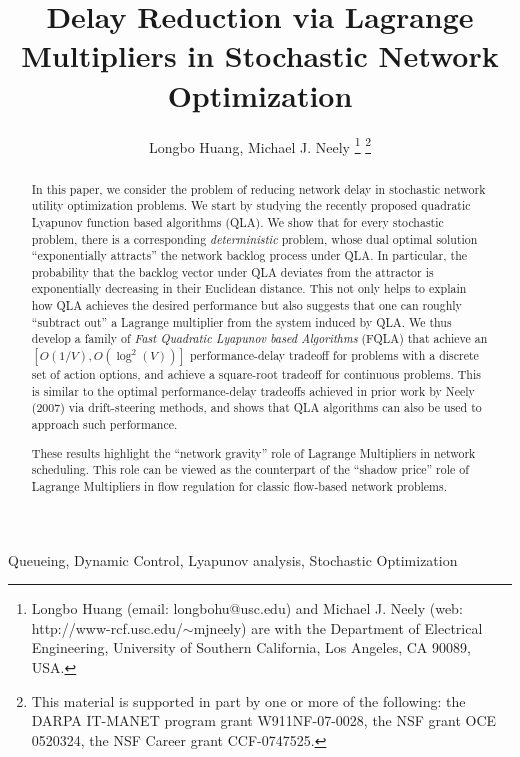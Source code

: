 \documentclass[journal]{IEEEtran}
\begin{document}
\title{Delay Reduction via Lagrange Multipliers in Stochastic Network Optimization}
\author{\large{Longbo Huang, Michael J. Neely}%
\thanks{Longbo Huang (email: longbohu@usc.edu)
and Michael J. Neely (web:  http://www-rcf.usc.edu/$\sim$mjneely)
are with the Department of Electrical
Engineering, University of Southern California, Los Angeles, CA 90089, USA.}%
\thanks{This material is supported in part  by one or more of 
the following: the DARPA IT-MANET program
grant W911NF-07-0028, the NSF grant OCE 0520324, 
the NSF Career grant CCF-0747525.} }
\maketitle

\newtheorem{rem}{Remark}
\newtheorem{fact_def}{\textbf{Fact}}
\newtheorem{coro}{\textbf{Corollary}}
\newtheorem{lemma}{\textbf{Lemma}}
\newtheorem{main}{\textbf{Proposition}}
\newtheorem{thm}{\textbf{Theorem}}
\newtheorem{claim}{\emph{Claim}}
\newtheorem{prop}{Proposition}
\newtheorem{assumption}{\textbf{Assumption}}



\begin{abstract}
In this paper, we consider the problem of reducing network delay in stochastic network utility optimization problems. We start by studying the recently proposed quadratic Lyapunov function based algorithms (QLA). We show that for every stochastic problem, there is a corresponding \emph{deterministic} problem, whose dual optimal solution ``exponentially attracts'' the network backlog process under QLA. In particular, the probability that the backlog vector under QLA deviates from the attractor is exponentially decreasing in their Euclidean distance.  This not only helps to explain how QLA achieves the desired performance but also suggests that one can roughly ``subtract out'' a Lagrange multiplier from the system induced by QLA. We thus develop a family of \emph{Fast Quadratic Lyapunov based Algorithms} (FQLA) that achieve an $[O(1/V), O(\log^2(V))]$ performance-delay tradeoff for problems with a discrete set of action options, and achieve a square-root tradeoff for continuous problems. This is similar to the optimal performance-delay tradeoffs achieved in prior work by Neely (2007) via drift-steering methods, and shows that QLA algorithms can also be used to approach such performance. 

These results highlight the ``network gravity'' role of Lagrange Multipliers in network scheduling. This role can be viewed as the counterpart of the ``shadow price'' role of Lagrange Multipliers in flow regulation for classic flow-based network problems. 

\end{abstract}
\begin{keywords}
Queueing, Dynamic Control, Lyapunov analysis,  Stochastic Optimization
\end{keywords}
\end{document}
